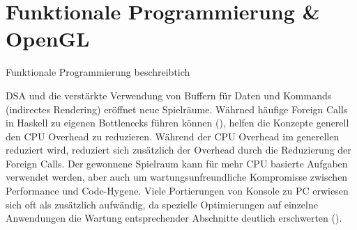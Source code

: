 \chapter{Funktionale Programmierung \& OpenGL}
\label{chap:haskell-modern-gl}

Funktionale Programmierung beschreibtich

\ac{DSA} und die verstärkte Verwendung von Buffern für Daten und Kommands (indirectes Rendering) eröffnet neue Spielräume. Währned häufige Foreign Calls in Haskell zu eigenen Bottlenecks führen können (), helfen die Konzepte generell den CPU Overhead zu reduzieren. Während der CPU Overhead im generellen reduziert wird, reduziert sich zusätzlich der Overhead durch die Reduzierung der Foreign Calls. Der gewonnene Spielraum kann für mehr CPU basierte Aufgaben verwendet werden, aber auch um wartungsunfreundliche Kompromisse zwischen Performance und Code-Hygene. Viele Portierungen von Konsole zu PC erwiesen sich oft als zusätzlich aufwändig, da spezielle Optimierungen auf einzelne Anwendungen die Wartung entsprechender Abschnitte deutlich erschwerten ().

